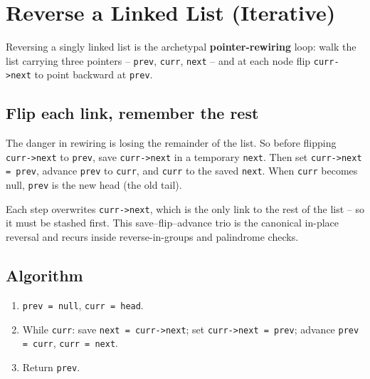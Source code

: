 \section{Reverse a Linked List (Iterative)}
\label{sec:ll-reverse-iterative}


\begin{patternbox}
Reversing a singly linked list is the archetypal \textbf{pointer-rewiring}
loop: walk the list carrying three pointers -- \texttt{prev},
\texttt{curr}, \texttt{next} -- and at each node flip \texttt{curr->next} to
point backward at \texttt{prev}.
\end{patternbox}

\subsection*{Flip each link, remember the rest}

The danger in rewiring is losing the remainder of the list. So before
flipping \texttt{curr->next} to \texttt{prev}, save \texttt{curr->next} in a
temporary \texttt{next}. Then set \texttt{curr->next = prev}, advance
\texttt{prev} to \texttt{curr}, and \texttt{curr} to the saved
\texttt{next}. When \texttt{curr} becomes null, \texttt{prev} is the new
head (the old tail).

\begin{ideabox}
Each step overwrites \texttt{curr->next}, which is the only link to the rest
of the list -- so it must be stashed first. This save--flip--advance trio is
the canonical in-place reversal and recurs inside reverse-in-groups and
palindrome checks.
\end{ideabox}

\subsection*{Algorithm}

\begin{enumerate}
  \item \texttt{prev = null}, \texttt{curr = head}.
  \item While \texttt{curr}: save \texttt{next = curr->next}; set
        \texttt{curr->next = prev}; advance \texttt{prev = curr},
        \texttt{curr = next}.
  \item Return \texttt{prev}.
\end{enumerate}

